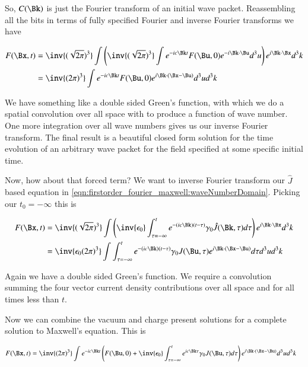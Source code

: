 So, $C(\Bk)$ is just the Fourier transform of an initial wave packet.  Reassembling all the bits in terms of fully specified Fourier and inverse Fourier transforms we have

\begin{align*}
F(\Bx,t) 
&=
\inv{(\sqrt{2\pi})^3} \int 
\left(
\inv{(\sqrt{2\pi})^3} \int e^{-ic \Bk t} F(\Bu,0) e^{-i \Bk \cdot \Bu} d^3 u
\right)
e^{i \Bk \cdot \Bx} d^3 k \\
&= \inv{({2\pi})^3} \int e^{-ic \Bk t} F(\Bu,0) e^{i \Bk \cdot (\Bx - \Bu)} d^3 u d^3 k \\
\end{align*}

We have something like a double sided Green's function, with which we do a spatial convolution over all space with to produce a function of wave number.  One more integration over all wave numbers gives us our inverse Fourier transform.  The final result is a beautiful closed form solution for the time evolution of an arbitrary wave packet for the field specified at some specific initial time.

Now, how about that forced term?  We want to inverse Fourier transform our $\hat{J}$ based equation in \ref{eqn:firstorder_fourier_maxwell:waveNumberDomain}.  Picking our $t_0 = -\infty$ this is

\begin{align*}
F(\Bx,t) 
&=
\inv{(\sqrt{2\pi})^3} \int 
\left( \inv{\epsilon_0} \int_{\tau = -\infty}^{t} e^{-(i c \Bk) (t -\tau)} \gamma_0 \hat{J}(\Bk,\tau) d\tau  \right) e^{i \Bk \cdot \Bx} d^3 k \\
&=
\inv{\epsilon_0 ({2\pi})^3} \int 
\int_{\tau = -\infty}^{t} e^{-(i c \Bk) (t -\tau)} \gamma_0 {J}(\Bu,\tau) 
e^{i \Bk \cdot (\Bx-\Bu)} 
d\tau  
d^3 u
d^3 k
\end{align*}

Again we have a double sided Green's function.  We require a convolution summing the four vector current density contributions over all space and for all times less than $t$.

Now we can combine the vacuum and charge present solutions for a complete solution to Maxwell's equation.  This is

\begin{align}
F(\Bx,t) 
&=
\inv{({2\pi})^3} \int 
e^{-i c \Bk t}
\left(
F(\Bu, 0) + \inv{\epsilon_0} \int_{\tau = -\infty}^{t} e^{i c \Bk \tau } \gamma_0 J(\Bu,\tau)  d\tau  
\right)
e^{i \Bk \cdot (\Bx-\Bu)} 
d^3 u
d^3 k
\end{align}

